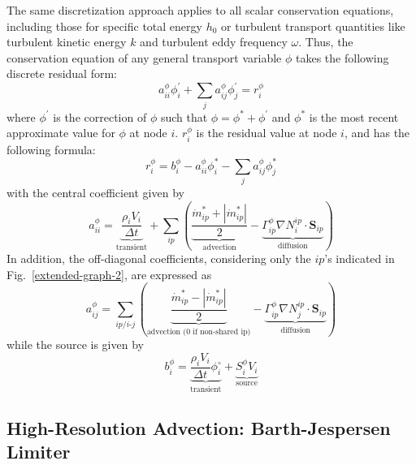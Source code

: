 \documentclass[12pt]{extarticle}
\newcommand{\<}{\langle}
\renewcommand{\>}{\rangle}
\theoremstyle{definition}
\begin{document}
The same discretization approach applies to all scalar conservation equations, including those for specific total energy $h_0$ or turbulent transport quantities like turbulent kinetic energy $k$ and turbulent eddy frequency $\omega$. Thus, the conservation equation of any general transport variable $\phi$ takes the following discrete residual form:
\begin{equation}
    a_{ii}^{\phi} \phi_i^\prime + \sum_{j} a_{ij}^{\phi} \phi_j^\prime = r_i^{\phi}
    \label{eq:phi_discrete}
\end{equation}
where $\phi^\prime$ is the correction of $\phi$ such that $\phi = \phi^* + \phi^\prime$ and $\phi^*$ is the most recent approximate value for $\phi$ at node $i$. $r_i^\phi$ is the residual value at node $i$, and has the following formula: 
\begin{equation}
    r_i^\phi = b_i^\phi - a_{ii}^{\phi} \phi_i^* - \sum_{j} a_{ij}^{\phi} \phi_j^*
\end{equation}
with the central coefficient given by
\begin{equation}
    a_{ii}^{\phi} = \underbrace{\frac{\rho_i V_i}{\Delta t}}_\text{transient}+\sum_{ip} \left( \underbrace{\frac{\dot{m}_{ip}^* + |\dot{m}_{ip}^*|}{2}}_{\text{advection}}-\underbrace{\Gamma^\phi_{ip}\nabla N_i^{ip} \cdot \textbf{S}_{ip}}_\text{diffusion} \right)
\end{equation}
In addition, the off-diagonal coefficients, considering only the $ip$'s indicated in Fig.~\ref{extended-graph-2}, are expressed as
\begin{equation}
    a_{ij}^{\phi} = \sum_{ip/i\text{-}j} \left( \underbrace{\frac{\dot{m}_{ip}^* - |\dot{m}_{ip}^*|}{2}}_{\text{advection (0 if non-shared ip)}}- \underbrace{\Gamma^\phi_{ip} \nabla N_j^{ip} \cdot \textbf{S}_{ip}}_\text{diffusion} \right)
\end{equation}
while the source is given by
\begin{equation}
    b_i^{\phi} = \underbrace{\frac{\rho_i V_i}{\Delta t}\phi_i^{\circ}}_\text{transient} + \underbrace{S_i^{\phi} V_i}_\text{source}
\end{equation}

\subsection{High-Resolution Advection: Barth-Jespersen Limiter}
\end{document}
